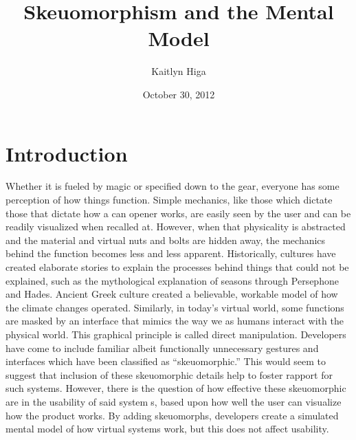 \documentclass[12pt onesided letterpaper]{report}
\title{Skeuomorphism and the Mental Model}
\author{Kaitlyn Higa}
\date{October 30, 2012}
\begin{document}
\section*{Introduction}
Whether it is fueled by magic or specified down to the gear, everyone has some perception of how things function.  Simple mechanics, like those which dictate those that dictate how a can opener works, are easily seen by the user and can be readily visualized when recalled at.  However, when that physicality is abstracted and the material and virtual nuts and bolts are hidden away, the mechanics behind the function becomes less and less apparent.  Historically, cultures have created elaborate stories to explain the processes behind things that could not be explained, such as the mythological explanation of seasons through Persephone and Hades.  Ancient Greek culture created a believable, workable model of how the climate changes operated.  Similarly, in today’s virtual world, some functions are masked by an interface that mimics the way we as humans interact with the physical world.  This graphical principle is called direct manipulation.  Developers have come to include familiar albeit functionally unnecessary gestures and interfaces which have been classified as “skeuomorphic.” This would seem to suggest that inclusion of these skeuomorphic details help to foster rapport for such systems.  However, there is the question of how effective these skeuomorphic are in the usability of said systems, based upon how well the user can visualize how the product works.   By adding skeuomorphs, developers create a simulated mental model of how virtual systems work, but this does not affect usability.
\end{document}

